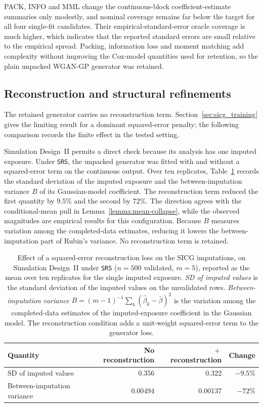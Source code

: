 PACK, INFO and MML change the continuous-block coefficient-estimate summaries only modestly, and nominal coverage remains far below the target for all four single-fit candidates. Their empirical-standard-error oracle coverage is much higher, which indicates that the reported standard errors are small relative to the empirical spread. Packing, information loss and moment matching add complexity without improving the Cox-model quantities used for retention, so the plain unpacked WGAN-GP generator was retained.

\subsection{Reconstruction and structural refinements}
\label{sec:sicg_ablation_refine}

The retained generator carries no reconstruction term. Section~\ref{sec:sicg_training} gives the limiting result for a dominant squared-error penalty; the following comparison records the finite effect in the tested setting.

Simulation Design~II permits a direct check because its analysis has one imputed exposure. Under \texttt{SRS}, the unpacked generator was fitted with and without a squared-error term on the continuous output. Over ten replicates, Table~\ref{tab:sicg_mse} records the standard deviation of the imputed exposure and the between-imputation variance $B$ of its Gaussian-model coefficient. The reconstruction term reduced the first quantity by $9.5\%$ and the second by $72\%$. The direction agrees with the conditional-mean pull in Lemma~\ref{lemma:mean-collapse}, while the observed magnitudes are empirical results for this configuration. Because $B$ measures variation among the completed-data estimates, reducing it lowers the between-imputation part of Rubin's variance. No reconstruction term is retained.

\begin{table}[!htbp]
\centering
\caption{Effect of a squared-error reconstruction loss on the SICG imputations, on Simulation Design~II
  under \texttt{SRS} ($n = 500$ validated, $m = 5$), reported as the mean over ten
  replicates for the single imputed exposure. \emph{SD of imputed values} is the
  standard deviation of the imputed values on the unvalidated rows. \emph{Between-imputation
  variance} $B = (m-1)^{-1}\sum_{k}(\hat\beta_k - \bar\beta)^2$ is the variation among the
  completed-data estimates of the imputed-exposure coefficient in the Gaussian model. The
  reconstruction condition adds a unit-weight squared-error term to the generator loss.}
\label{tab:sicg_mse}
\small
\setlength{\tabcolsep}{8pt}
\begin{tabular}{lrrr}
\toprule
Quantity & No reconstruction & ${}+{}$ reconstruction & Change \\
\midrule
SD of imputed values         & 0.356   & 0.322   & $-9.5\%$ \\
Between-imputation variance   & 0.00494 & 0.00137 & $-72\%$  \\
\bottomrule
\end{tabular}
\end{table}

